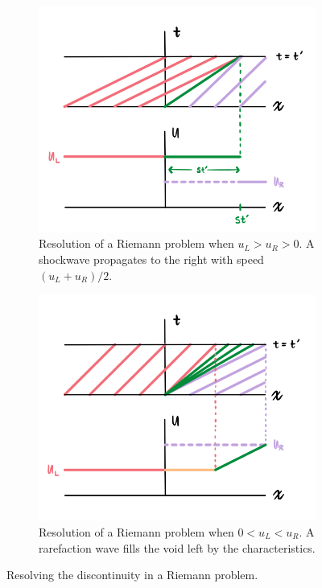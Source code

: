 \documentclass{myproject}
\begin{document}
\begin{figure}
    \centering
    \begin{subfigure}{.48\textwidth}
        \centering
        \includegraphics[width=1.0\textwidth]{riemann_shockwave.png}
        \caption{Resolution of a Riemann problem when $u_L > u_R > 0$. A shockwave propagates to the right with speed $(u_L+u_R)/2$.}
        \label{fig:shock}
    \end{subfigure}\hfill
    \begin{subfigure}{.48\textwidth}
        \centering
        \includegraphics[width=1\textwidth]{riemann_rarefaction.png}
        \caption{Resolution of a Riemann problem when $0<u_L<u_R$. A rarefaction wave fills the void left by the characteristics.}
        \label{fig:rarefaction}
    \end{subfigure}
    \caption{Resolving the discontinuity in a Riemann problem.}
    \label{fig:riemann_discontinuities}
\end{figure}
\end{document}

